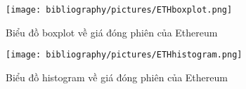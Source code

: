 \begin{figure}[H]
    \centering
    \begin{minipage}{0.23\textwidth}
    \centering
    \texttt{[image: bibliography/pictures/ETHboxplot.png]}
    \caption{Biểu đồ boxplot về giá đóng phiên của Ethereum}
    \label{fig:1}
    \end{minipage}
    \hfill
    \begin{minipage}{0.23\textwidth}
    \centering
    \texttt{[image: bibliography/pictures/ETHhistogram.png]}
    \caption{Biểu đồ histogram về giá đóng phiên của Ethereum}
    \label{fig:2}
    \end{minipage}
\end{figure}